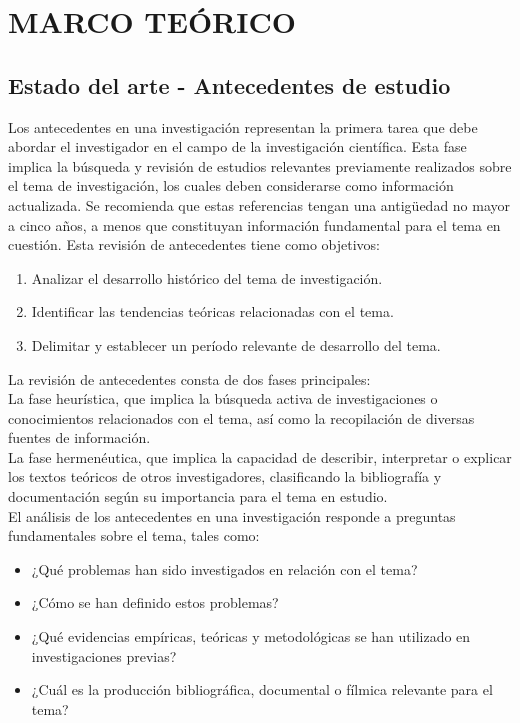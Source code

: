 \documentclass[12pt,a4paper,oneside]{report}
\begin{document}
\chapter{MARCO TEÓRICO}

\section{Estado del arte - Antecedentes de estudio}

Los antecedentes en una investigación representan la primera tarea que debe abordar el investigador en el campo de la investigación científica. Esta fase implica la búsqueda y revisión de estudios relevantes previamente realizados sobre el tema de investigación, los cuales deben considerarse como información actualizada. Se recomienda que estas referencias tengan una antigüedad no mayor a cinco años, a menos que constituyan información fundamental para el tema en cuestión. Esta revisión de antecedentes tiene como objetivos:

\begin{enumerate}
    \item Analizar el desarrollo histórico del tema de investigación.
    \item Identificar las tendencias teóricas relacionadas con el tema.
    \item Delimitar y establecer un período relevante de desarrollo del tema.
\end{enumerate}

La revisión de antecedentes consta de dos fases principales:\\

La fase heurística, que implica la búsqueda activa de investigaciones o conocimientos relacionados con el tema, así como la recopilación de diversas fuentes de información.\\

La fase hermenéutica, que implica la capacidad de describir, interpretar o explicar los textos teóricos de otros investigadores, clasificando la bibliografía y documentación según su importancia para el tema en estudio.\\

El análisis de los antecedentes en una investigación responde a preguntas fundamentales sobre el tema, tales como:\\

\begin{itemize}
    \item ¿Qué problemas han sido investigados en relación con el tema?
    \item ¿Cómo se han definido estos problemas?
    \item ¿Qué evidencias empíricas, teóricas y metodológicas se han utilizado en investigaciones previas?
    \item ¿Cuál es la producción bibliográfica, documental o fílmica relevante para el tema?
\end{itemize}
\end{document}
